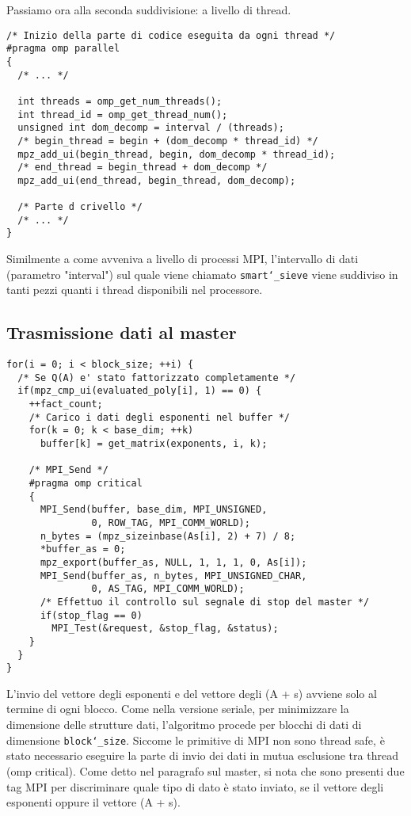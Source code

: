 Passiamo ora alla seconda suddivisione: a livello di thread.
\begin{lstlisting}
/* Inizio della parte di codice eseguita da ogni thread */
#pragma omp parallel
{ 
  /* ... */
 
  int threads = omp_get_num_threads();
  int thread_id = omp_get_thread_num();
  unsigned int dom_decomp = interval / (threads);
  /* begin_thread = begin + (dom_decomp * thread_id) */
  mpz_add_ui(begin_thread, begin, dom_decomp * thread_id); 
  /* end_thread = begin_thread + dom_decomp */
  mpz_add_ui(end_thread, begin_thread, dom_decomp); 

  /* Parte d crivello */
  /* ... */
}
\end{lstlisting}
Similmente a come avveniva a livello di processi MPI, l'intervallo di
dati (parametro "interval") sul quale viene chiamato
\texttt{smart\char`_sieve} viene suddiviso in tanti pezzi quanti i thread
disponibili nel processore.
\subsection{Trasmissione dati al master}
\begin{lstlisting}
for(i = 0; i < block_size; ++i) {
  /* Se Q(A) e' stato fattorizzato completamente */
  if(mpz_cmp_ui(evaluated_poly[i], 1) == 0) {
    ++fact_count;
    /* Carico i dati degli esponenti nel buffer */
    for(k = 0; k < base_dim; ++k)
      buffer[k] = get_matrix(exponents, i, k);

    /* MPI_Send */
    #pragma omp critical 
    {
      MPI_Send(buffer, base_dim, MPI_UNSIGNED, 
               0, ROW_TAG, MPI_COMM_WORLD);
      n_bytes = (mpz_sizeinbase(As[i], 2) + 7) / 8;
      *buffer_as = 0;
      mpz_export(buffer_as, NULL, 1, 1, 1, 0, As[i]);
      MPI_Send(buffer_as, n_bytes, MPI_UNSIGNED_CHAR, 
               0, AS_TAG, MPI_COMM_WORLD);
      /* Effettuo il controllo sul segnale di stop del master */
      if(stop_flag == 0)
        MPI_Test(&request, &stop_flag, &status);
    }
  }
}
\end{lstlisting}
L'invio del vettore degli esponenti e del vettore degli (A + s)
avviene solo al termine di ogni blocco. Come nella versione seriale, 
per minimizzare la dimensione delle strutture dati, l'algoritmo
procede per blocchi di dati di dimensione \texttt{block\char`_size}. Siccome
le primitive di MPI non sono thread safe, è stato necessario eseguire
la parte di invio dei dati in mutua esclusione tra
thread (omp critical). Come detto nel paragrafo sul master, si nota
che sono presenti due tag MPI per discriminare quale
tipo di dato è stato inviato, se il vettore degli esponenti oppure il
vettore (A + s).
